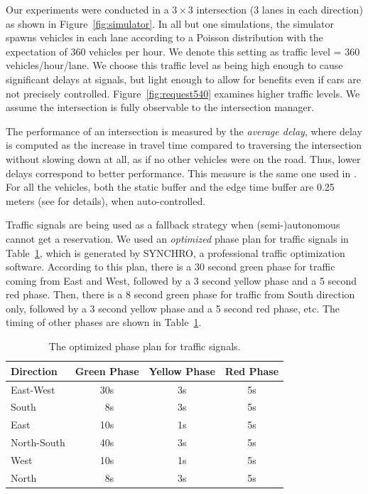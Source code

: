 Our experiments were conducted in a $3 \times 3$ intersection (3 lanes
in each direction) as shown in Figure~\ref{fig:simulator}.  In all but
one simulations, the simulator spawns vehicles in each lane according
to a Poisson distribution with the expectation of 360 vehicles per
hour.  We denote this setting as traffic level = 360
vehicles/hour/lane.  We choose this traffic level as being high enough
to cause significant delays at signals, but light enough to allow for
benefits even if cars are not precisely
controlled. Figure~\ref{fig:request540} examines higher traffic
levels. We assume the intersection is fully observable to the
intersection manager.

The performance of an intersection is measured by the \emph{average
delay}, where delay is computed as the increase in travel time
compared to traversing the intersection without slowing down at all,
as if no other vehicles were on the road. Thus, lower delays
correspond to better performance.  This measure is the same one used
in \cite{bib:Dresner08Multiagent}. For all the vehicles, both the
static buffer and the edge time buffer are 0.25 meters (see
\cite{bib:Dresner08Multiagent} for details), when auto-controlled.

Traffic signals are being used as a fallback strategy when
(semi-)autonomous cannot get a reservation.  We used an
\emph{optimized} phase plan for traffic signals in
Table~\ref{table:phase}, which is generated by SYNCHRO, a professional
traffic optimization software.  According to this plan, there is a 30
second green phase for traffic coming from East and West, followed by
a 3 second yellow phase and a 5 second red phase.  Then, there is a 8
second green phase for traffic from South direction only, followed by
a 3 second yellow phase and a 5 second red phase, etc.  The timing of
other phases are shown in Table~\ref{table:phase}.

\begin{table}
\caption{The optimized phase plan for traffic signals.}
\label{table:phase}
\centering
\small
\begin{tabular}{|l|c|c|c|}
\hline
Direction & Green Phase & Yellow Phase & Red Phase \\
\hline
  East-West & 30s & 3s & 5s \\
  South & \ 8s & 3s & 5s \\
  East & 10s & 1s & 5s \\
  North-South & 40s & 3s & 5s \\
  West & 10s & 1s & 5s \\
  North & \ 8s & 3s & 5s \\
\hline
\end{tabular}
\end{table}

